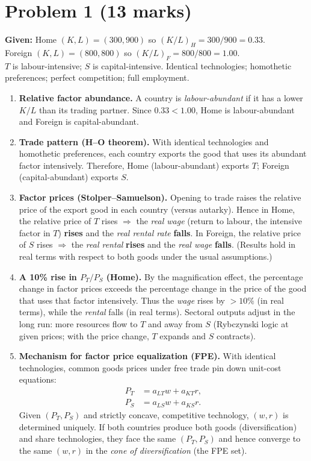 \documentclass[12pt]{article}
\begin{document}
\section*{Problem 1 (13 marks)}

\textbf{Given:} Home $(K,L)=(300,900)$ so $(K/L)_H = 300/900 = 0.33$.\\
Foreign $(K,L)=(800,800)$ so $(K/L)_F = 800/800 = 1.00$.\\
$T$ is labour-intensive; $S$ is capital-intensive. Identical technologies; homothetic preferences; perfect competition; full employment.

\begin{enumerate}[label=(\arabic*)]
\item \textbf{Relative factor abundance.} A country is \emph{labour-abundant} if it has a lower $K/L$ than its trading partner. Since $0.33 < 1.00$, Home is labour-abundant and Foreign is capital-abundant.

\item \textbf{Trade pattern (H--O theorem).} With identical technologies and homothetic preferences, each country exports the good that uses its abundant factor intensively. Therefore, Home (labour-abundant) exports $T$; Foreign (capital-abundant) exports $S$.

\item \textbf{Factor prices (Stolper--Samuelson).} Opening to trade raises the relative price of the export good in each country (versus autarky). Hence in Home, the relative price of $T$ rises $\Rightarrow$ the \emph{real wage} (return to labour, the intensive factor in $T$) \textbf{rises} and the \emph{real rental rate} \textbf{falls}. In Foreign, the relative price of $S$ rises $\Rightarrow$ the \emph{real rental} \textbf{rises} and the \emph{real wage} \textbf{falls}. (Results hold in real terms with respect to both goods under the usual assumptions.)

\item \textbf{A 10\% rise in $P_T/P_S$ (Home).} By the magnification effect, the percentage change in factor prices exceeds the percentage change in the price of the good that uses that factor intensively. Thus the \emph{wage} rises by \(>\!10\%\) (in real terms), while the \emph{rental} falls (in real terms). Sectoral outputs adjust in the long run: more resources flow to $T$ and away from $S$ (Rybczynski logic at given prices; with the price change, $T$ expands and $S$ contracts).

\item \textbf{Mechanism for factor price equalization (FPE).} With identical technologies, common goods prices under free trade pin down unit-cost equations:
\[
\begin{aligned}
P_T &= a_{LT}w + a_{KT}r,\\
P_S &= a_{LS}w + a_{KS}r.
\end{aligned}
\]
Given $(P_T,P_S)$ and strictly concave, competitive technology, $(w,r)$ is determined uniquely. If both countries produce both goods (diversification) and share technologies, they face the same $(P_T,P_S)$ and hence converge to the same $(w,r)$ in the \emph{cone of diversification} (the FPE set).
\end{enumerate}
\end{document}
